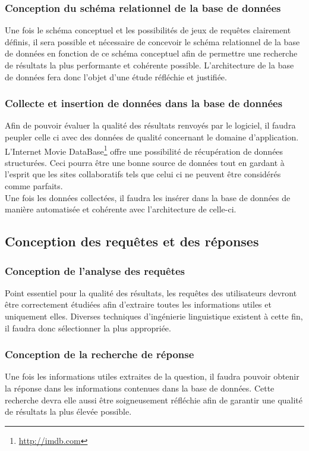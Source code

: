\documentclass[a4paper,12pt]{article}
\begin{document}
\subsubsection{Conception du schéma relationnel de la base de données}
Une fois le schéma conceptuel et les possibilités de jeux de requêtes clairement définis, il sera possible et nécessaire de concevoir le schéma relationnel de la base de données en fonction de ce schéma conceptuel afin de permettre une recherche de résultats la plus performante et cohérente possible.
L'architecture de la base de données fera donc l'objet d'une étude réfléchie et justifiée.
\subsubsection{Collecte et insertion de données dans la base de données}
Afin de pouvoir évaluer la qualité des résultats renvoyés par le logiciel, il faudra peupler celle ci avec des données de qualité concernant le domaine d'application.
L'Internet Movie DataBase\footnote{\url{http://imdb.com}} offre une possibilité de récupération de données structurées.
Ceci pourra être une bonne source de données tout en gardant à l'esprit que les sites collaboratifs tels que celui ci ne peuvent être considérés comme parfaits. \\

Une fois les données collectées, il faudra les insérer dans la base de données de manière automatisée et cohérente avec l'architecture de celle-ci.
\subsection{Conception des requêtes et des réponses}
\subsubsection{Conception de l'analyse des requêtes}
Point essentiel pour la qualité des résultats, les requêtes des utilisateurs devront être correctement étudiées afin d'extraire toutes les informations utiles et uniquement elles.
Diverses techniques d'ingénierie linguistique existent à cette fin, il faudra donc sélectionner la plus appropriée. 
\subsubsection{Conception de la recherche de réponse}
Une fois les informations utiles extraites de la question, il faudra pouvoir obtenir la réponse dans les informations contenues dans la base de données.
Cette recherche devra elle aussi être soigneusement réfléchie afin de garantir une qualité de résultats la plus élevée possible.
\end{document}
